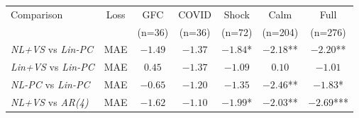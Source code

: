 \begin{tabular}{lcccccc}
\toprule
Comparison & Loss & GFC & COVID & Shock & Calm & Full \\
 &  & (n=36) & (n=36) & (n=72) & (n=204) & (n=276) \\
\midrule
\emph{NL+VS} vs \emph{Lin-PC}  & MAE & $-1.49$    & $-1.37$    & $-1.84$*  & $-2.18$** & $-2.20$** \\
\emph{Lin+VS} vs \emph{Lin-PC} & MAE & $0.45$     & $-1.37$    & $-1.09$   & $0.10$    & $-1.01$ \\
\emph{NL-PC} vs \emph{Lin-PC}  & MAE & $-0.65$    & $-1.20$    & $-1.35$   & $-2.46$** & $-1.83$* \\
\emph{NL+VS} vs \emph{AR(4)}   & MAE & $-1.62$    & $-1.10$    & $-1.99$*  & $-2.03$** & $-2.69$*** \\
\bottomrule
\end{tabular}
